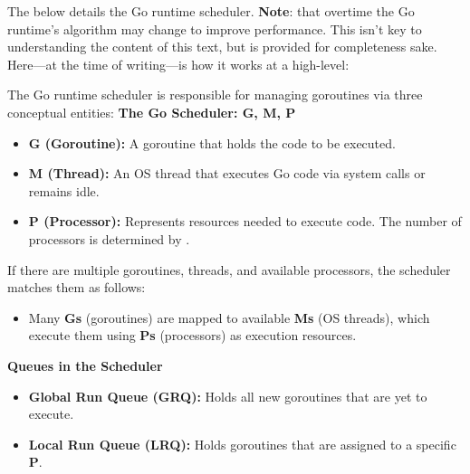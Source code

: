 \newpage 

\noindent
The below details the Go runtime scheduler. \textbf{Note}: that overtime the Go runtime's algorithm may change to improve 
performance. This isn't key to understanding the content of this text, but is provided for completeness sake. Here---at the time of writing---is how it works at a high-level:

\vspace{2em}
\begin{Def}

    The Go runtime scheduler is responsible for managing goroutines via three conceptual entities:
\textbf{The Go Scheduler: G, M, P}
\begin{itemize}
    \item \textbf{G (Goroutine):} A goroutine that holds the code to be executed.
    \item \textbf{M (Thread):} An OS thread that executes Go code via system calls or remains idle.
    \item \textbf{P (Processor):} Represents resources needed to execute code. The number of processors is determined by .
\end{itemize}

\noindent
If there are multiple goroutines, threads, and available processors, the scheduler matches them as follows:
\begin{itemize}
    \item Many \textbf{Gs} (goroutines) are mapped to available \textbf{Ms} (OS threads), which execute them using \textbf{Ps} (processors) as execution resources.
\end{itemize}

\noindent
\textbf{Queues in the Scheduler}
\begin{itemize}
    \item \textbf{Global Run Queue (GRQ):} Holds all new goroutines that are yet to execute.
    \item \textbf{Local Run Queue (LRQ):} Holds goroutines that are assigned to a specific \textbf{P}.
\end{itemize}


\end{Def}
